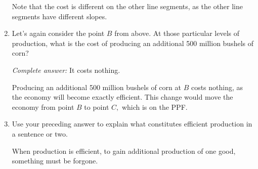 \documentclass[
    letterpaper,paper=portrait,fleqn,
    DIV=16,fontsize=12pt,twoside=semi,
    parskip=full-,
    headings=standardclasses]
{scrartcl}
\begin{document}
\begin{enumerate}
\begin{solution}
Note that the cost is different on the other line segments, as the other line segments have different slopes.
\end{solution}

\clearpage

\item Let's again consider the point $B$ from above. At those particular levels of production, what is the cost of producing an additional 500 million bushels of corn?

\begin{solution}
\emph{Complete answer:} It costs nothing.

Producing an additional 500 million bushels of corn at $B$ costs nothing, as the economy will become exactly efficient. This change would move the economy from point $B$ to point $C,$ which is on the PPF.
\end{solution}

\item Use your preceding answer to explain what constitutes efficient production in a sentence or two.

\begin{solution}
When production is efficient, to gain additional production of one good, something must be forgone.
\end{solution}

\end{enumerate}
\end{document}
